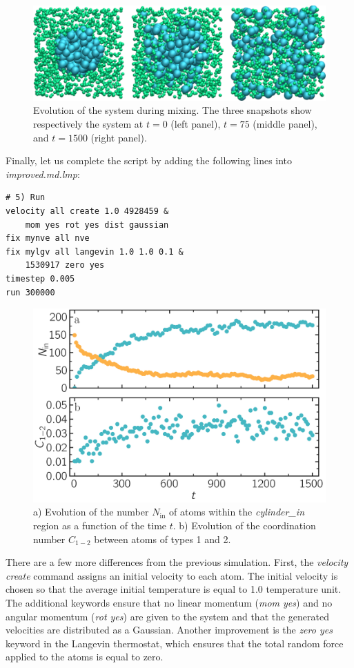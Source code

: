 \documentclass[9pt,tutorial]{livecoms}
\begin{document}
\begin{figure}
\centering
\includegraphics[width=\linewidth]{LJ-evolution}
\caption{Evolution of the system during mixing. The three snapshots show
respectively the system at $t=0$ (left panel), $t=75$ (middle panel), and $t=1500$
(right panel).}
\label{fig:evolution-population}
\end{figure}

Finally, let us complete the script by adding the following lines into
\textit{improved.md.lmp}:
{\normalsize
\begin{verbatim}
# 5) Run
velocity all create 1.0 4928459 &
    mom yes rot yes dist gaussian
fix mynve all nve
fix mylgv all langevin 1.0 1.0 0.1 &
    1530917 zero yes
timestep 0.005
run 300000
\end{verbatim}
}

\begin{figure}
\centering
\includegraphics[width=\linewidth]{LJ-mixing}
\caption{a) Evolution of the number $N_\text{in}$ of atoms within the
\textit{cylinder\_in} region as a function of the time $t$. b) Evolution of
the coordination number $C_{1-2}$ between atoms of types 1 and 2.}
\label{fig:mixing}
\end{figure}

There are a few more differences from the previous simulation.  First,
the \textit{velocity create} command assigns an initial velocity to each
atom.  The initial velocity is chosen so that the average initial
temperature is equal to 1.0 temperature unit.  The additional keywords
ensure that no linear momentum (\textit{mom yes}) and no angular
momentum (\textit{rot yes}) are given to the system and that the
generated velocities are distributed as a Gaussian.  Another improvement
is the \textit{zero yes} keyword in the Langevin thermostat, which
ensures that the total random force applied to the atoms is equal to
zero.
\end{document}
